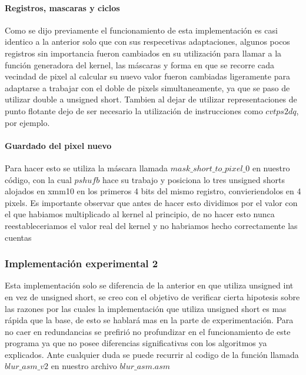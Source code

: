 \paragraph{Registros, mascaras y ciclos}

Como se dijo previamente el funcionamiento de esta implementación es casi identico a la anterior solo que con sus respecetivas adaptaciones, algunos pocos registros sin importancia fueron cambiados en su utilización para llamar a la función generadora del kernel, las máscaras y forma en que se recorre cada vecindad de pixel al calcular su nuevo valor fueron cambiadas ligeramente para adaptarse a trabajar con el doble de pixels simultaneamente, ya que se paso de utilizar double a unsigned short. Tambien al dejar de utilizar representaciones de punto flotante dejo de ser necesario la utilización de instrucciones como $cvtps2dq$, por ejemplo.

\paragraph{Guardado del pixel nuevo}

Para hacer esto se utiliza la máscara llamada $mask\_short\_to\_pixel\_0$ en nuestro código, con la cual $pshufb$ hace su trabajo y posiciona lo tres unsigned shorts alojados en xmm10 en los primeros 4 bits del mismo registro, convieriendolos en 4 pixels. Es importante observar que antes de hacer esto dividimos por el valor con el que habiamos multiplicado al kernel al principio, de no hacer esto nunca reestableceriamos el valor real del kernel y no habriamos hecho correctamente las cuentas

\subsubsection{Implementación experimental 2}

Esta implementación solo se diferencia de la anterior en que utiliza unsigned int en vez de unsigned short, se creo con el objetivo de verificar cierta hipotesis sobre las razones por las cuales la implementación que utiliza unsigned short es mas rápida que la base, de esto se hablará mas en la parte de experimentación. Para no caer en redundancias se prefirió no profundizar en el funcionamiento de este programa ya que no posee diferencias significativas con los algoritmos ya explicados. Ante cualquier duda se puede recurrir al codigo de la función llamada $blur\_asm\_v2$ en nuestro archivo $blur\_asm.asm$

